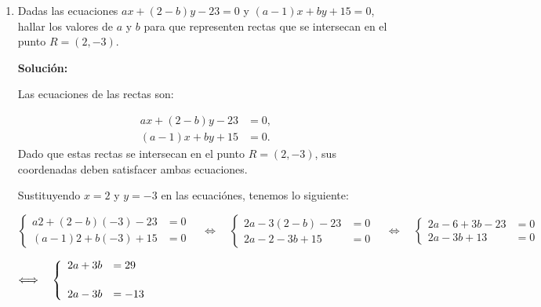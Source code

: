 \documentclass[11pt]{article}
\newcommand{\indicador}[4]{
{\tikz[remember picture,overlay]\coordinate (#1) at #2;}{\tikz[remember picture,overlay]\coordinate (#3) at #4;} 
}
\newcommand{\marka}[2]{
{\tikz[remember picture,overlay]\coordinate (#1) at #2;}
}
\begin{document}
\begin{enumerate}[\hspace{-5mm} 1) ]
\begin{enumerate}[(a)]
\begin{center}
\end{center}

\end{enumerate}

\item  Dadas las ecuaciones $ax + (2 - b)y - 23 = 0$ y $(a - 1)x + by + 15 = 0$, hallar los valores de $a$ y $b$ para que representen rectas que se intersecan en el punto $R = (2,-3)$.

\textbf{Solución:}  

Las ecuaciones de las rectas son: 


\vspace{-18mm}
\begin{align*}
    ax + (2 - b)y - 23 &= 0, \\
    (a - 1)x + by + 15 &= 0.
\end{align*}
Dado que estas rectas se intersecan en el punto $R = (2,-3)$, sus coordenadas deben satisfacer ambas ecuaciones.

Sustituyendo $x = 2$ y $y = -3$ en las  ecuaciónes, tenemos lo siguiente:

\[
\left\{
\begin{array}{rl}
 a 2+ (2 - b)(-3) - 23 &= 0 \\
    (a - 1)2 + b(-3) + 15 &= 0
\end{array}
\right.
\quad
\Longleftrightarrow 
\quad 
\left\{
\begin{array}{rl}
 2a - 3(2 - b) - 23 &= 0 \\
2a - 2 - 3b + 15 &= 0
\end{array}
\right.
\quad
\Longleftrightarrow 
\quad 
\left\{
\begin{array}{rl}
2a - 6 + 3b - 23 &= 0 \\
 2a - 3b + 13 &= 0
\end{array}
\right.
\]


\bigskip 


$\Longleftrightarrow 
\quad 
\left\{
\begin{array}{rl}
2a + 3b  &= 29   \marka{a}{(.1,.25)}
\\[5mm]
 2a - 3b  &= -13 \indicador{b}{(.1,.15)}{c}{(.9,.45)} \marka{d}{(1.6,.45)}
\end{array}
\right.
$



\end{enumerate}
\end{document}
